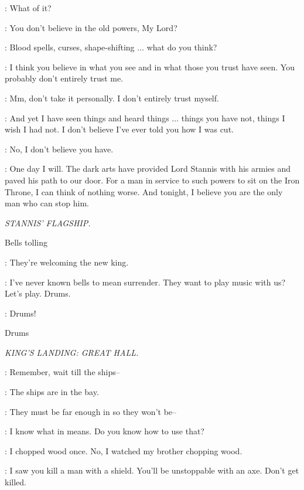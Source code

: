 \TYRION: What of it? 

\VARYS: You don't believe in the old powers, My Lord? 

\TYRION: Blood spells, curses, shape-shifting $\ldots$ what do you think? 

\VARYS: I think you believe in what you see and in what those you trust have seen. You probably don't entirely trust me. 

\TYRION: Mm, don't take it personally. I don't entirely trust myself. 

\VARYS: And yet I have seen things and heard things $\ldots$  things you have not, things I wish I had not. I don't believe I've ever told you how I was cut. 

\TYRION: No, I don't believe you have. 

\VARYS: One day I will. The dark arts have provided Lord Stannis with his armies and paved his path to our door. For a man in service to such powers to sit on the Iron Throne, I can think of nothing worse. And tonight, I believe you are the only man who can stop him. 



\scene

\textit{STANNIS' FLAGSHIP.}


\sfx Bells tolling

\MATTHOS: They're welcoming the new king. 

\DAVOS: I've never known bells to mean surrender. They want to play music with us? Let's play. Drums. 

\MATTHOS:  Drums! 

\sfx Drums


\scene

\textit{KING'S LANDING: GREAT HALL.}


\TYRION: Remember, wait till the ships--  

\BRONN: The ships are in the bay. 

\TYRION: They must be far enough in so they won't be--

\BRONN: I know what in means. Do you know how to use that? 

\TYRION: I chopped wood once. No, I watched my brother chopping wood. 

\BRONN: I saw you kill a man with a shield. You'll be unstoppable with an axe. Don't get killed. 

